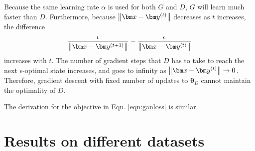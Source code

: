 \documentclass{article} %
\begin{document}
Because the same learning rate $\alpha$ is used for both $G$ and $D$, $G$ will learn much faster than $D$. Furthermore, because $\norm{\bm x - \bm y^{(t)}}$ decreases as $t $ increases, the difference
\[ \frac{\epsilon}{\norm{\bm x - \bm y^{(t + 1)}}} - \frac{\epsilon}{\norm{\bm x - \bm y^{(t)}}} \]
increases with $t$. The number of gradient steps that $D$ has to take to reach the next $\epsilon$-optimal state increases, and goes to infinity as $\norm{\bm x - \bm y^{(t)}} \rightarrow 0$. Therefore, gradient descent with fixed number of updates to $\bm \theta_D$ cannot maintain the optimality of $D$.

The derivation for the objective in Eqn. \ref{eqn:ganloss} is similar.


\section{Results on different datasets}\label{appx:result}
\end{document}
